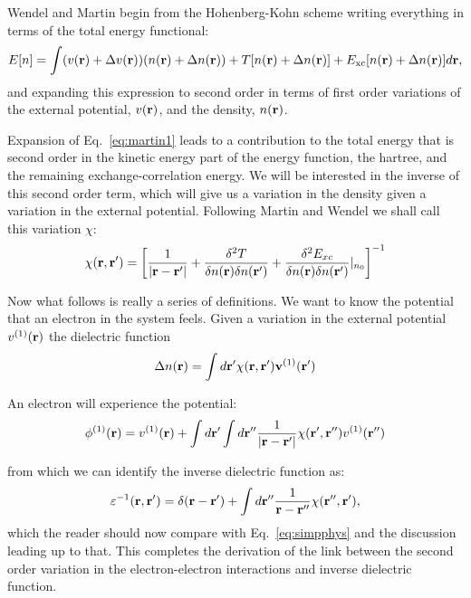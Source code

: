 Wendel and Martin begin from the Hohenberg-Kohn scheme writing everything in terms of the total energy functional:
%
\begin{equation}
\label{eq:martin1}
E[n] =\int (v({\bf r})+\Delta v({\bf r}))(n({\bf r})+\Delta n({\bf r})) + T[n({\bf r})+\Delta n({\bf r})] + E_{\rm xc}[n({\bf r}) +\Delta n({\bf r})]d{\bf r},
\end{equation}
%
and expanding this expression to second order in terms of first order variations of the external potential,
$v({\bf r})$, and the density, $n({\bf r})$. 

Expansion of Eq.~\ref{eq:martin1} leads to a contribution to the total energy that is second order in
the kinetic energy part of the energy function, the hartree, and 
the remaining exchange-correlation energy. We will be interested in the 
inverse of this second order term, which will give us a variation in the 
density given a variation in the external potential.
Following Martin and Wendel we shall call this variation $\chi$:
%
\begin{equation}
\label{eq:martin2}
\chi({\bf r},{\bf r}') = \left[\frac{1}{|{\bf r}-{\bf r}'|} + \frac{\delta^{2} T}{\delta n({\bf r})\delta n({\bf r}')}+\frac{\delta^{2} E_{xc}}
	{\delta n({\bf r})\delta n({\bf r}')}|_{n_0}\right]^{-1}
\end{equation}
%

Now what follows is really a series of definitions. We want to know the potential that an electron 
in the system feels. Given a variation in the external potential $v^{(1)}({\bf r})$ the dielectric function   
%
\begin{equation}
\Delta n({\bf r}) = \int d{\bf r}' \chi({\bf r},{\bf r}') \mathbf{v}^{(1)}({\bf r}')
\end{equation}
%

An electron will experience the potential:
%
\begin{equation}
\phi^{(1)}({\bf r}) = v^{(1)}({\bf r}) + \int d{\bf r}' \int d{\bf r}''\frac{1}{|{\bf r} -{\bf r}'|}\chi({\bf r}',{\bf r}'')v^{(1)}({\bf r}'')
\end{equation}
%

from which we can identify the inverse dielectric function as:
%
\begin{equation}
\varepsilon^{-1}({\bf r},{\bf r}') =  \delta({\bf r}-{\bf r}') + \int d{\bf r}'' \frac{1}{{\bf r}-{\bf r}''}\chi({\bf r}'',{\bf r}'),
\end{equation}
%
which the reader should now compare with Eq.~\ref{eq:simpphys} and the discussion leading up to that.
This completes the derivation of the link between the second order variation in the 
electron-electron interactions and inverse dielectric function.


